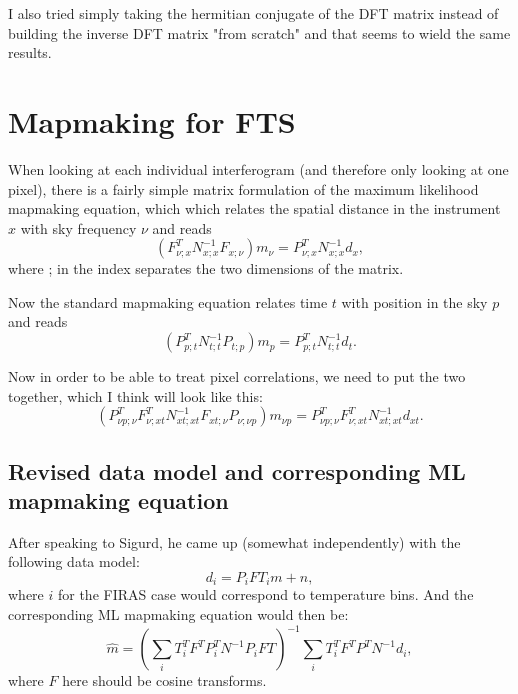 \documentclass{article}
\begin{document}
I also tried simply taking the hermitian conjugate of the DFT matrix instead of building the inverse DFT matrix "from scratch" and that seems to wield the same results.

\section{Mapmaking for FTS}

When looking at each individual interferogram (and therefore only looking at one pixel), there is a fairly simple matrix formulation of the maximum likelihood mapmaking equation, which which relates the spatial distance in the instrument $x$ with sky frequency $\nu$ and reads
\begin{equation}
	(F^T_{\nu; x} N^{-1}_{x;x} F_{x;\nu}) m_\nu = P^T_{\nu; x} N^{-1}_{x;x} d_x,
\end{equation}
where ; in the index separates the two dimensions of the matrix.

Now the standard mapmaking equation relates time $t$ with position in the sky $p$ and reads
\begin{equation}
	(P^T_{p;t} N^{-1}_{t;t} P_{t;p})m_p = P^T_{p;t} N^{-1}_{t;t}d_t.
\end{equation}

Now in order to be able to treat pixel correlations, we need to put the two together, which I think will look like this:
\begin{equation}
	(P^T_{\nu p;\nu}F^T_{\nu;xt} N^{-1}_{xt;xt} F_{xt;\nu}P_{\nu;\nu p})m_{\nu p} = P^T_{\nu p;\nu}F^T_{\nu;xt} N^{-1}_{xt;xt}d_{xt}.
\end{equation}

\subsection{Revised data model and corresponding ML mapmaking equation}

After speaking to Sigurd, he came up (somewhat independently) with the following data model:
\begin{equation}
	d_i = P_i F T_i m + n,
\end{equation}
where $i$ for the FIRAS case would correspond to temperature bins. And the corresponding ML mapmaking equation would then be:
\begin{equation}
	\hat m = \left(\sum_i T_i^T F^T P_i^T N^{-1} P_i F T \right)^{-1} \sum_i T_i^T F^T P^T N^{-1} d_i,
\end{equation}
where $F$ here should be cosine transforms.
\end{document}
